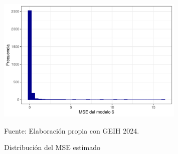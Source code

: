         \begin{figure}[H]
            \caption{Distribución del MSE estimado}
            \centering
            \includegraphics[width=0.8\textwidth]{imagenes/histograma_mse.pdf}
             \label{fig:hist_mse}
            \begin{minipage}{7\textwidth}
            \footnotesize
            \hspace{2cm} Fuente: Elaboración propia con GEIH 2024.
            \end{minipage}
        \end{figure}